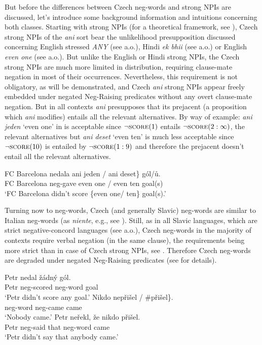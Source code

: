 \noindent But before the differences between Czech neg-words and strong NPIs are discussed, let's introduce some background information and intuitions concerning both classes. Starting with strong NPIs (for a theoretical framework, see \cite{gajewski2011licensing}), Czech strong NPIs of the \textit{ani} sort bear the unlikelihood presupposition discussed concerning English stressed  \emph{ANY} (see \citealt{krifka1995semantics} a.o.), Hindi \emph{ek bhii} (see \citealt{lahiri1998focus} a.o.) or English \emph{even one} (see \citealt{crnivc2014non} a.o.). But unlike the English or Hindi strong NPIs, the Czech strong NPIs are much more limited in distribution, requiring clause-mate negation in most of their occurrences. Nevertheless, this requirement is not obligatory, as will be demonstrated, and Czech \textit{ani} strong NPIs appear freely embedded under negated Neg-Raising predicates without any overt clause-mate negation. But in all contexts \textit{ani} presupposes that its prejacent (a proposition which \textit{ani} modifies) entails all the relevant alternatives. By way of example: \textit{ani jeden} `even one' in  is acceptable since $\neg \textsc{score}(1)$ entails $\neg \textsc{score}(2:\infty)$, the relevant alternatives but \textit{ani deset} `even ten' is much less acceptable since $\neg \textsc{score}(10)$ is entailed by $\neg \textsc{score}(1:9)$ and therefore the prejacent doesn't entail all the relevant alternatives. 
  
\ea\label{ex-2}\gll FC Barcelona nedala \minsp{\{} ani jeden / \minsp{\#} ani deset\} gól/ů.\\
FC Barcelona neg-gave {} even one / {} even ten goal(s)\\
\glt `FC Barcelona didn't score \{even one/\minsp{\#} ten\} goal(s).'
\z

\noindent Turning now to neg-words, Czech (and generally Slavic) neg-words are similar to Italian neg-words (as \emph{niente}, e.g., see \citealt{ladusaw1992expressing}). Still, as in all Slavic languages, which are strict negative-concord languages (see \citealt{zeijlstra2004sentential} a.o.), Czech neg-words in the majority of contexts require verbal negation (in the same clause), the requirements being more strict than in case of Czech strong NPIs, see . Therefore Czech neg-words are degraded under negated Neg-Raising predicates (see \citealt{dovcekal2016experimentala,docekaldotlacilsubedinb} for details).

\ea\label{ex-3}  
\ea \gll Petr nedal žádný gól.\\
  Petr neg-scored neg-word goal\\
  \glt `Petr didn't score any goal.' 
\ex \gll Nikdo  \minsp{\{} nepřišel / \#přišel\}.\\
  neg-word {} neg-came {} came\\
  \glt `Nobody came.' 
\ex \gll *Petr neřekl, že nikdo přišel.\\
  Petr neg-said that neg-word came\\
  \glt `Petr didn't say that anybody came.'
\z\z 

